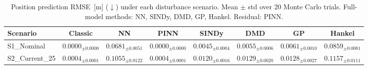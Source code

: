 \begin{table}[htbp]
\centering
\caption{Position prediction RMSE~[m] ($\downarrow$) under each disturbance scenario. Mean $\pm$ std over 20 Monte Carlo trials. Full-model methods: NN, SINDy, DMD, GP, Hankel. Residual: PINN.}
\label{tab:bench_scenarios}
\begin{tabular}{lccccccc}
\toprule
Scenario & \textbf{Classic} & \textbf{NN} & \textbf{PINN} & \textbf{SINDy} & \textbf{DMD} & \textbf{GP} & \textbf{Hankel} \\
\midrule
S1\_Nominal & $0.0000_{\pm0.0000}$ & $0.0681_{\pm0.0051}$ & $0.0000_{\pm0.0000}$ & $0.0045_{\pm0.0004}$ & $0.0055_{\pm0.0006}$ & $0.0061_{\pm0.0010}$ & $0.0859_{\pm0.0081}$ \\
S2\_Current\_25 & $0.0004_{\pm0.0001}$ & $0.1055_{\pm0.0122}$ & $0.0004_{\pm0.0001}$ & $0.0120_{\pm0.0016}$ & $0.0129_{\pm0.0020}$ & $0.0128_{\pm0.0027}$ & $0.1157_{\pm0.0111}$ \\
\bottomrule
\end{tabular}
\end{table}